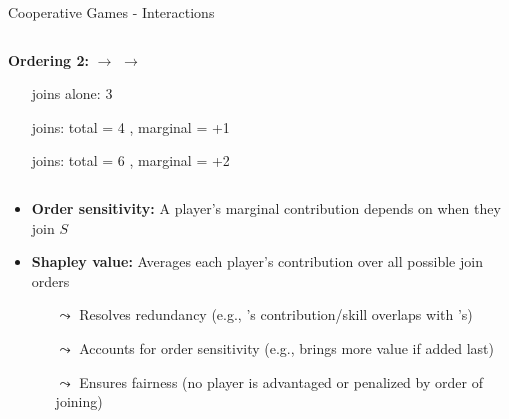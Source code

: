 \documentclass[11pt,compress,t,notes=noshow, aspectratio=169, xcolor=table]{beamer}
\begin{document}
\begin{frame}{Cooperative Games - Interactions}
\begin{columns}[T, totalwidth=\linewidth]
\begin{column}{0.5\textwidth}
\textbf{Ordering 2:}  $\rightarrow$  $\rightarrow$ 
\begin{itemize}
  \item[\colorcircle{playerblue}{white}{3}] joins alone: 3 
  \item[\colorcircle{playerred}{white}{1}] joins: total = 4 , marginal = +1
  \item[\colorcircle{playeryellow}{white}{2}] joins: total = 6 , marginal = +2
\end{itemize}
    \end{column}
\end{columns}
\pause
\begin{itemize}
  \item \textbf{Order sensitivity:} A player's marginal contribution depends on when they join $S$
  \item \textbf{Shapley value:} Averages each player’s contribution over all possible join orders
  \begin{itemize}
    \item[$\leadsto$] Resolves redundancy (e.g., ’s contribution/skill overlaps with ’s)
    \item[$\leadsto$] Accounts for order sensitivity (e.g.,  brings more value if added last)
    \item[$\leadsto$] Ensures fairness (no player is advantaged or penalized by order of joining)%
  \end{itemize}
\end{itemize}

\end{frame}
\end{document}
